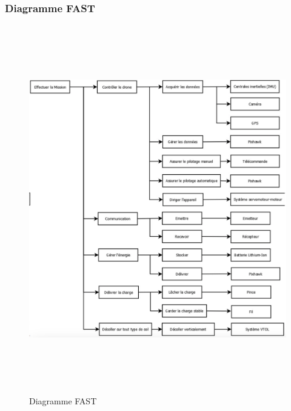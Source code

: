 \documentclass[a4paper,12pt,french]{report}
\begin{document}
\newpage
\subsubsection*{Diagramme FAST}

\begin{figure}[h]
    \centering
    \includegraphics[height=16cm]{figures/fast.png}
    \caption{Diagramme FAST}
    \label{fonctions}
\end{figure}

\newpage
\end{document}
